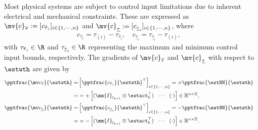 \documentclass[journal]{IEEEtran}
\begin{document}
Most physical systems are subject to control input limitations due to inherent electrical and mechanical constraints.
These are expressed as $\mv{c}_{\overline \tau}:= [c_{\overline \tau_i}]_{i\in\{1,\cdots,n\}}$ and $\mv{c}_{\underline\tau}:= [c_{\underline\tau_i}]_{i\in\{1,\cdots,n\}}$, where
\begin{equation}
    \begin{aligned}
        c_{\overline \tau_i}=\tau_{(i)} - {\tau_{\overline \tau_i}}
        ,
        \quad
        c_{\underline\tau_i}={\tau_{\underline\tau_i}}-\tau_{(i)}
        ,
    \end{aligned}
    \label{eq:cstr:input:bound}
\end{equation}
with $\tau_{\overline \tau_i}\in\R$ and $\tau_{\underline\tau_i}\in\R$ representing the maximum and minimum control input bounds, respectively.
The gradients of $\mv{c}_{\overline \tau}$ and $\mv{c}_{\underline\tau}$ with respect to $\estwth$ are given by
\begin{equation}
    \begin{aligned}
        \pptfrac{\mv c_{\overline \tau}}{\estwth}
        =& 
        \left[
            \pptfrac{c_{\overline \tau_i}}{\estwth}^\top
        \right]_{i\in\{1,\cdots,n\}}
        = 
            +\pptfrac{\estNN}{\estwth}
            \\
        =&
        =
        +
        \begin{bmatrix}
            (\mm{I}_{l_{k+1}}\otimes \estact_{k}^\top)&
            \!\cdots\! &
            (
                \cdot
            )
        \end{bmatrix} 
        \in
        \mathbb R^{n\times \Xi}
        , 
        \\
        \pptfrac{\mv c_{\underline\tau}}{\estwth}         
        =
        & 
        \left[
            \pptfrac{c_{\underline\tau_i}}{\estwth}^\top
        \right]_{i\in\{1,\cdots,n\}}
        = 
        -\pptfrac{\estNN}{\estwth}
        \\
        =&
        =
        -\begin{bmatrix}
            (\mm{I}_{l_{k+1}}\otimes \estact_{k}^\top)&
            \!\cdots\! &
            (
                \cdot
            )
        \end{bmatrix} 
        \in
        \mathbb R^{n\times \Xi}
        .
    \end{aligned}
    \label{eq:cstr:input:bound:grad}
\end{equation}
\end{document}

